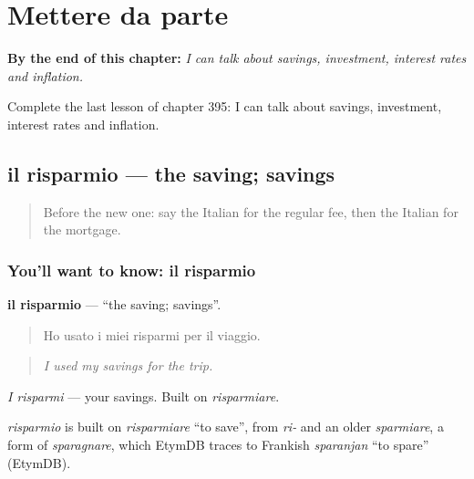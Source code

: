 
\chapter{Mettere da parte}
\label{ch:it-mettere-da-parte}

\begin{chapteropening}
\textbf{By the end of this chapter:} \emph{I can talk about savings, investment, interest rates and inflation.}

Complete the last lesson of chapter 395: I can talk about savings, investment, interest rates and inflation.
\end{chapteropening}

\section[il risparmio]{il risparmio — the saving; savings}

\label{lesson:IT-C395-risparmio}



\begin{quote}
Before the new one: say the Italian for the regular fee, then the Italian for the mortgage.
\end{quote}

\subsection*{You'll want to know: il risparmio}
\textbf{il risparmio} — \textquotedblleft{}the saving; savings\textquotedblright{}.

\begin{quote}
Ho usato i miei risparmi per il viaggio.
\end{quote}

\begin{quote}
\emph{I used my savings for the trip.}
\end{quote}

\emph{I risparmi} — your savings. Built on \emph{risparmiare}.

\begin{cousinweb}
\emph{risparmio} is built on \emph{risparmiare} \textquotedblleft{}to save\textquotedblright{}, from \emph{ri-} and an older \emph{sparmiare}, a form of \emph{sparagnare}, which EtymDB traces to Frankish \emph{sparanjan} \textquotedblleft{}to spare\textquotedblright{} (EtymDB).
\end{cousinweb}

